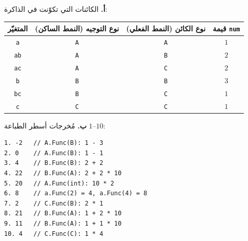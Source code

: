 \def\bagrutTocEntry{\phantomsection\addcontentsline{toc}{subsection}{\texorpdfstring{سؤال $12$ امتحان $\mathrm{899271}$ سنة $2026$}{سؤال 12 امتحان 899271 سنة 2026}}\global\let\bagrutTocEntry\relax}%



\ifwithsols
\begin{boxSolution}
\textbf{أ.} الكائنات التي تكوّنت في الذاكرة:
\begin{center}
\begin{english}
\begin{tabular}{|c|c|c|c|}
\hline
\textbf{\textarabic{المتغيّر}} & \textbf{\textarabic{نوع التوجيه (النمط الساكن)}} & \textbf{\textarabic{نوع الكائن (النمط الفعلي)}} & \textbf{\textarabic{قيمة} \texttt{num}} \\
\hline
\texttt{a} & \texttt{A} & \texttt{A} & $1$ \\ \hline
\texttt{ab} & \texttt{A} & \texttt{B} & $2$ \\ \hline
\texttt{ac} & \texttt{A} & \texttt{C} & $2$ \\ \hline
\texttt{b} & \texttt{B} & \texttt{B} & $3$ \\ \hline
\texttt{bc} & \texttt{B} & \texttt{C} & $1$ \\ \hline
\texttt{c} & \texttt{C} & \texttt{C} & $1$ \\ \hline
\end{tabular}
\end{english}
\end{center}

\textbf{ب.} مُخرجات أسطر الطباعة $1$–$10$:
\begin{boxCode}
\begin{english}
\begin{verbatim}
1. -2   // A.Func(B): 1 - 3
2. 0    // A.Func(B): 1 - 1
3. 4    // B.Func(B): 2 + 2
4. 22   // B.Func(A): 2 + 2 * 10
5. 20   // A.Func(int): 10 * 2
6. 8    // a.Func(2) = 4, a.Func(4) = 8
7. 2    // C.Func(B): 2 * 1
8. 21   // B.Func(A): 1 + 2 * 10
9. 11   // B.Func(A): 1 + 1 * 10
10. 4   // C.Func(C): 1 * 4
\end{verbatim}
\end{english}
\end{boxCode}
\end{boxSolution}
\fi
\filbreak
